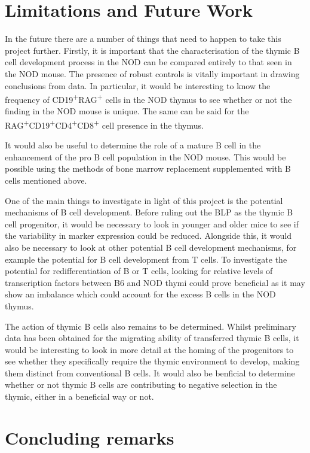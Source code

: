 \section{Limitations and Future Work}

In the future there are a number of things that need to happen to take this project further.
Firstly, it is important that the characterisation of the thymic B cell development process in the NOD can be compared entirely to that seen in the NOD mouse.
The presence of robust controls is vitally important in drawing conclusions from data.
In particular, it would be interesting to know the frequency of CD19\textsuperscript{+}RAG\textsuperscript{+} cells in the NOD thymus to see whether or not the finding in the NOD mouse is unique.
The same can be said for the RAG\textsuperscript{+}CD19\textsuperscript{+}CD4\textsuperscript{+}CD8\textsuperscript{+} cell presence in the thymus.

It would also be useful to determine the role of a mature B cell in the enhancement of the pro B cell population in the NOD mouse.
This would be possible using the methods of bone marrow replacement supplemented with B cells mentioned above.

One of the main things to investigate in light of this project is the potential mechanisms of B cell development.
Before ruling out the BLP as the thymic B cell progenitor, it would be necessary to look in younger and older mice to see if the variability in marker expression could be reduced.
Alongside this, it would also be necessary to look at other potential B cell development mechanisms, for example the potential for B cell development from T cells.
To investigate the potential for redifferentiation of B or T cells, looking for relative levels of transcription factors between B6 and NOD thymi could prove beneficial as it may show an imbalance which could account for the excess B cells in the NOD thymus.

The action of thymic B cells also remains to be determined. 
Whilst preliminary data has been obtained for the migrating ability of transferred thymic B cells, it would be interesting to look in more detail at the homing of the progenitors to see whether they specifically require the thymic environment to develop, making them distinct from conventional B cells.
It would also be benficial to determine whether or not thymic B cells are contributing to negative selection in the thymic, either in a beneficial way or not.

\section{Concluding remarks}



	
	
	
	
	
	
	